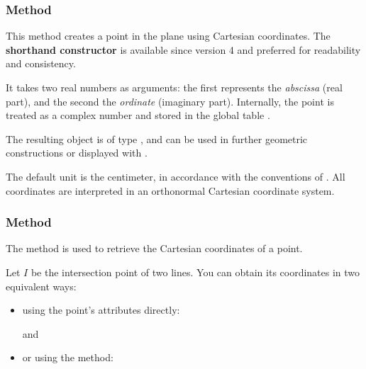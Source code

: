 \subsubsection{Method }
\label{ssub:method_point_new}

This method creates a point in the plane using Cartesian coordinates. The \textbf{shorthand constructor}  is available since version 4 and preferred for readability and consistency.

\medskip

It takes two real numbers as arguments: the first represents the \emph{abscissa} (real part), and the second the \emph{ordinate} (imaginary part). Internally, the point is treated as a complex number and stored in the global table .

\medskip

The resulting object is of type , and can be used in further geometric constructions or displayed with .

\medskip

 The default unit is the centimeter, in accordance with the conventions of . All coordinates are interpreted in an orthonormal Cartesian coordinate system.

\vspace{1em}

\begin{tkzexample}[latex = 7cm]
\end{tkzexample}

\subsubsection{Method }
\label{ssub:method_point_get}

The  method is used to retrieve the Cartesian coordinates of a point.

\medskip

Let $I$ be the intersection point of two lines. You can obtain its coordinates in two equivalent ways:
\begin{itemize}
  \item using the point’s attributes directly:
    \begin{center}
     \quad and \quad {}
    \end{center}
  \item or using the  method:
    \begin{center}
    \end{center}
\end{itemize}


